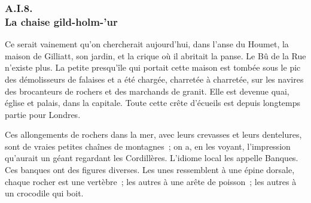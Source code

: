 \documentclass[french,twoside]{book} %
\begin{document}
 \subsubsection[{A.I.8. La chaise gild-holm-’ur}]{A.I.8. \\
La chaise gild-holm-’ur}
\noindent Ce serait vainement qu’on chercherait aujourd’hui, dans l’anse du Houmet, la maison de Gilliatt, son jardin, et la crique où il abritait la panse. Le Bû de la Rue n’existe plus. La petite presqu’île qui portait cette maison est tombée sous le pic des démolisseurs de falaises et a été chargée, charretée à charretée, sur les navires des brocanteurs de rochers et des marchands de granit. Elle est devenue quai, église et palais, dans la capitale. Toute cette crête d’écueils est depuis longtemps partie pour Londres.\par
Ces allongements de rochers dans la mer, avec leurs crevasses et leurs dentelures, sont de vraies petites chaînes de montagnes ; on a, en les voyant, l’impression qu’aurait un géant regardant les Cordillères. L’idiome local les appelle Banques. Ces banques ont des figures diverses. Les unes ressemblent à une épine dorsale, chaque rocher est une vertèbre ; les  autres à une arête de poisson ; les autres à un crocodile qui boit.\par
\end{document}

